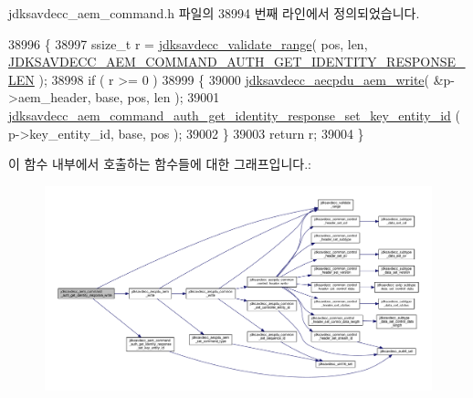 jdksavdecc\+\_\+aem\+\_\+command.\+h 파일의 38994 번째 라인에서 정의되었습니다.


\begin{DoxyCode}
38996 \{
38997     ssize\_t r = \hyperlink{group__util_ga9c02bdfe76c69163647c3196db7a73a1}{jdksavdecc\_validate\_range}( pos, len, 
      \hyperlink{group__command__auth__get__identity__response_gadbc33a846185a4f56131e8677ae3366f}{JDKSAVDECC\_AEM\_COMMAND\_AUTH\_GET\_IDENTITY\_RESPONSE\_LEN} 
      );
38998     \textcolor{keywordflow}{if} ( r >= 0 )
38999     \{
39000         \hyperlink{group__aecpdu__aem_gad658e55771cce77cecf7aae91e1dcbc5}{jdksavdecc\_aecpdu\_aem\_write}( &p->aem\_header, base, pos, len );
39001         \hyperlink{group__command__auth__get__identity__response_ga1e3b43fcd4400c7d81917e97b5afde2b}{jdksavdecc\_aem\_command\_auth\_get\_identity\_response\_set\_key\_entity\_id}
      ( p->key\_entity\_id, base, pos );
39002     \}
39003     \textcolor{keywordflow}{return} r;
39004 \}
\end{DoxyCode}


이 함수 내부에서 호출하는 함수들에 대한 그래프입니다.\+:
\nopagebreak
\begin{figure}[H]
\begin{center}
\leavevmode
\includegraphics[width=350pt]{group__command__auth__get__identity__response_ga9c3d7dfa24c84a804de2f3cc310d3a9d_cgraph}
\end{center}
\end{figure}


